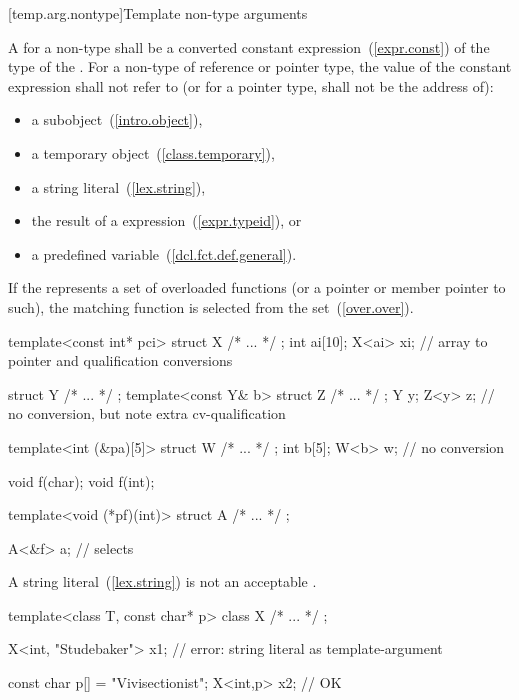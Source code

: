 [temp.arg.nontype]{Template non-type arguments}

\pnum
A
for a non-type
shall be
a converted
constant expression~(\ref{expr.const})
of the type of the .
For a non-type  of reference or pointer type,
the value of the constant expression shall not refer to
(or for a pointer type, shall not be the address of):

\begin{itemize}
\item a subobject~(\ref{intro.object}),
\item a temporary object~(\ref{class.temporary}),
\item a string literal~(\ref{lex.string}),
\item the result of a  expression~(\ref{expr.typeid}), or
\item a predefined  variable~(\ref{dcl.fct.def.general}).
\end{itemize}

\enternote
If the 
represents a set of overloaded functions
(or a pointer or member pointer to such),
the matching function is selected from the set~(\ref{over.over}).
\exitnote

\pnum
\enterexample
\begin{codeblock}
template<const int* pci> struct X { /* ... */ };
int ai[10];
X<ai> xi;                       // array to pointer and qualification conversions

struct Y { /* ... */ };
template<const Y& b> struct Z { /* ... */ };
Y y;
Z<y> z;                         // no conversion, but note extra cv-qualification

template<int (&pa)[5]> struct W { /* ... */ };
int b[5];
W<b> w;                         // no conversion

void f(char);
void f(int);

template<void (*pf)(int)> struct A { /* ... */ };

A<&f> a;                        // selects 
\end{codeblock}
\exitexample

\pnum
\enternote
A string literal~(\ref{lex.string})
is not an acceptable
.
\enterexample

\begin{codeblock}
template<class T, const char* p> class X {
  /* ... */
};

X<int, "Studebaker"> x1;        // error: string literal as template-argument

const char p[] = "Vivisectionist";
X<int,p> x2;                    // OK
\end{codeblock}
\exitexample
\exitnote

